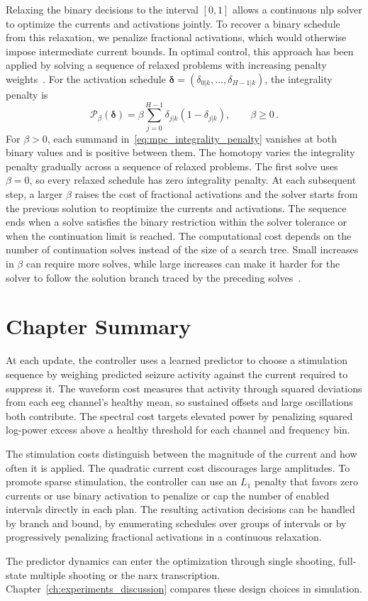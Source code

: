 Relaxing the binary decisions to the interval $[0, 1]$ allows a continuous \ac{nlp} solver to optimize the currents and activations jointly.
To recover a binary schedule from this relaxation, we penalize fractional activations, which would otherwise impose intermediate current bounds.
In optimal control, this approach has been applied by solving a sequence of relaxed problems with increasing penalty weights~\cite{Sager2006}.
For the activation schedule $\boldsymbol\delta=(\delta_{0|k},\ldots,\delta_{H-1|k})$, the integrality penalty is
%
\begin{equation}
    \mathcal P_\beta(\boldsymbol\delta)
    =\beta\sum_{j=0}^{H-1}\delta_{j|k}(1-\delta_{j|k}),
    \qquad\beta\geq0\,.
    \label{eq:mpc_integrality_penalty}
\end{equation}
%
For $\beta>0$, each summand in~\eqref{eq:mpc_integrality_penalty} vanishes at both binary values and is positive between them.
The homotopy varies the integrality penalty gradually across a sequence of relaxed problems.
The first solve uses $\beta=0$, so every relaxed schedule has zero integrality penalty.
At each subsequent step, a larger $\beta$ raises the cost of fractional activations and the solver starts from the previous solution to reoptimize the currents and activations.
The sequence ends when a solve satisfies the binary restriction within the solver tolerance or when the continuation limit is reached.
The computational cost depends on the number of continuation solves instead of the size of a search tree.
Small increases in $\beta$ can require more solves, while large increases can make it harder for the solver to follow the solution branch traced by the preceding solves~\cite{Sager2006}.

\section{Chapter Summary}

At each update, the controller uses a learned predictor to choose a stimulation sequence by weighing predicted seizure activity against the current required to suppress it.
The waveform cost measures that activity through squared deviations from each \ac{eeg} channel's healthy mean, so sustained offsets and large oscillations both contribute.
The spectral cost targets elevated power by penalizing squared log-power excess above a healthy threshold for each channel and frequency bin.

The stimulation costs distinguish between the magnitude of the current and how often it is applied.
The quadratic current cost discourages large amplitudes.
To promote sparse stimulation, the controller can use an $L_1$ penalty that favors zero currents or use binary activation to penalize or cap the number of enabled intervals directly in each plan.
The resulting activation decisions can be handled by branch and bound, by enumerating schedules over groups of intervals or by progressively penalizing fractional activations in a continuous relaxation.

The predictor dynamics can enter the optimization through single shooting, full-state multiple shooting or the \ac{narx} transcription.
Chapter~\ref{ch:experiments_discussion} compares these design choices in simulation.
